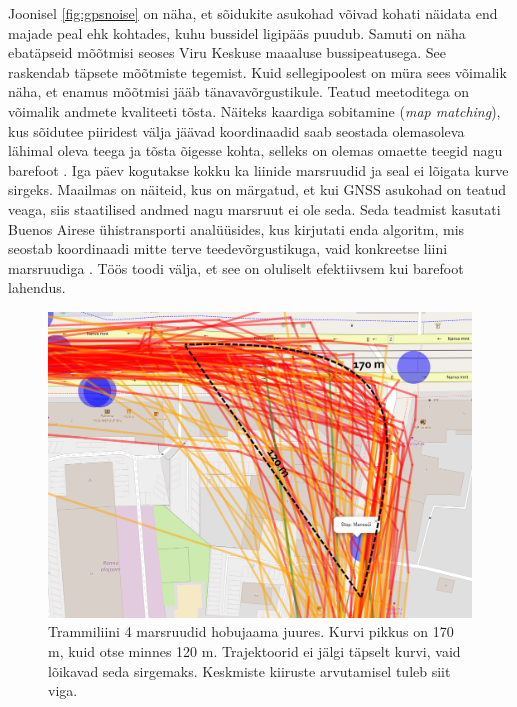Joonisel \ref{fig:gpsnoise} on näha, et sõidukite asukohad võivad kohati näidata end majade peal ehk  kohtades, kuhu bussidel ligipääs puudub. Samuti on näha ebatäpseid mõõtmisi seoses Viru Keskuse maaaluse bussipeatusega. See raskendab täpsete mõõtmiste tegemist. Kuid sellegipoolest on müra sees võimalik näha, et enamus mõõtmisi jääb tänavavõrgustikule. Teatud meetoditega on võimalik andmete kvaliteeti tõsta. Näiteks kaardiga sobitamine (\textit{map matching}), kus sõidutee piiridest välja jäävad koordinaadid saab seostada olemasoleva lähimal oleva teega ja tõsta õigesse kohta, selleks on olemas omaette teegid nagu barefoot \cite{barefoot}. Iga päev kogutakse kokku ka liinide marsruudid ja seal ei lõigata kurve sirgeks. Maailmas on näiteid, kus on märgatud, et kui GNSS asukohad on teatud veaga, siis staatilised andmed nagu marsruut ei ole seda. Seda teadmist kasutati Buenos Airese ühistransporti analüüsides, kus kirjutati enda algoritm, mis seostab koordinaadi mitte terve teedevõrgustikuga, vaid konkreetse liini marsruudiga \cite{buenosAires}. Töös toodi välja, et see on oluliselt efektiivsem kui barefoot lahendus.

\begin{figure}[H] %
    \centering
    \includegraphics[width=.8\textwidth]{figures/Kurvsirgemaks.png} %
    \caption{Trammiliini 4 marsruudid hobujaama juures. Kurvi pikkus on 170 m, kuid otse minnes 120 m. Trajektoorid ei jälgi täpselt kurvi, vaid lõikavad seda sirgemaks. Keskmiste kiiruste arvutamisel tuleb siit viga.} %
    \label{fig:kurvsirgeks} %
\end{figure}


